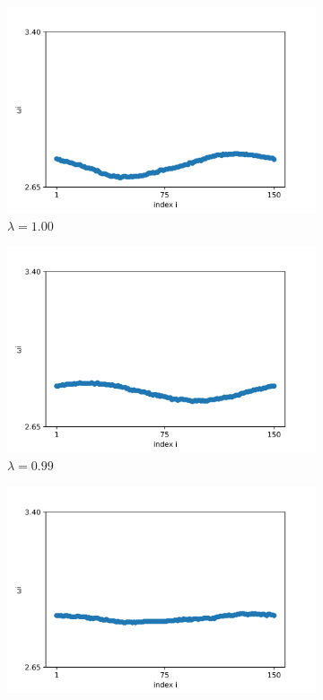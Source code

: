 \documentclass[a4paper,12pt]{article}
\begin{document}
\begin{figure}[H]
\begin{subfigure}{.32\textwidth}
  \centering
  \includegraphics[width=1\linewidth]{w_lambda=1.0_t=2000.png}  
  \caption{$\lambda=1.00$}
\end{subfigure}
\hfill
\begin{subfigure}{.32\textwidth}
  \centering
  \includegraphics[width=1\linewidth]{w_lambda=0.99_t=2000.png}  
  \caption{$\lambda=0.99$}
\end{subfigure}
\hfill
\begin{subfigure}{.32\textwidth}
  \centering
  \includegraphics[width=1\linewidth]{w_lambda=0.98_t=2000}  

\end{subfigure}
\end{figure}
\end{document}

